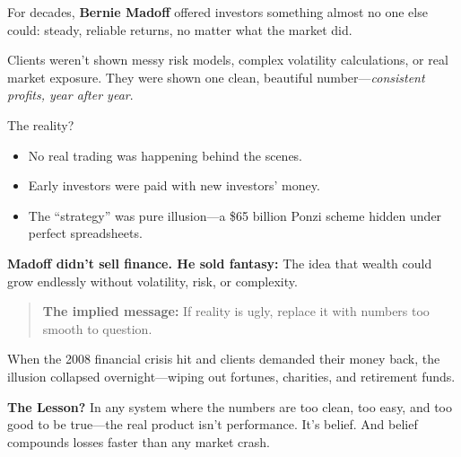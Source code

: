 \begin{tcolorbox}[colback=blue!5!white, colframe=blue!50!black,
  title={Historical Sidebar: Bernie Madoff — When the Fantasy Sells Better Than the Math}]

For decades, \textbf{Bernie Madoff} offered investors something almost no one else could:  steady, reliable returns, no matter what the market did.

\medskip

Clients weren’t shown messy risk models, complex volatility calculations, or real market exposure.  They were shown one clean, beautiful number—\textit{consistent profits, year after year}.

\medskip

The reality?

\medskip

\begin{itemize}
    \item No real trading was happening behind the scenes.
    \item Early investors were paid with new investors’ money.
    \item The “strategy” was pure illusion—a \$65 billion Ponzi scheme hidden under perfect spreadsheets.
\end{itemize}

\medskip

\textbf{Madoff didn’t sell finance. He sold fantasy:}  The idea that wealth could grow endlessly without volatility, risk, or complexity.

\medskip

\begin{quote}
\textbf{The implied message:} If reality is ugly, replace it with numbers too smooth to question.
\end{quote}

\medskip

When the 2008 financial crisis hit and clients demanded their money back, the illusion collapsed overnight—wiping out fortunes, charities, and retirement funds.

\medskip

\textbf{The Lesson?} In any system where the numbers are too clean, too easy, and too good to be true—the real product isn’t performance.  It’s belief. And belief compounds losses faster than any market crash.

\end{tcolorbox}

